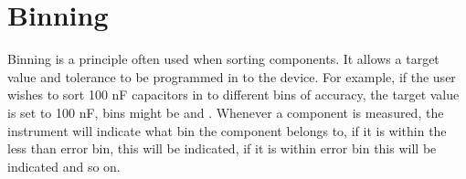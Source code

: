 \section{Binning} \label{sec:5_1_Binning}
Binning is a principle often used when sorting components. It allows a target value and tolerance to be programmed in to the device. For example, if the user wishes to sort 100 nF capacitors in to different bins of accuracy, the target value is set to 100 nF, bins might be  and . Whenever a component is measured, the instrument will indicate what bin the component belongs to, if it is within the less than  error bin, this will be indicated, if it is within  error bin this will be indicated and so on.